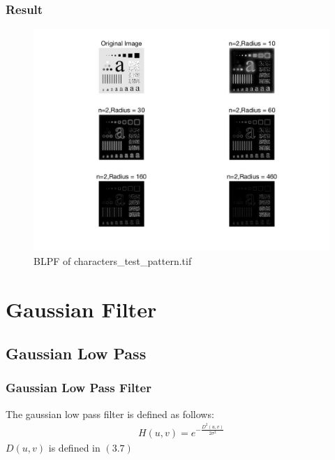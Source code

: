\documentclass[11pt,oneside]{book}
\begin{document}
\subsubsection{Result}
\begin{figure}[!htb]
   \centering  
   \includegraphics[width=1.0\textwidth]{images/3/BHPF.jpg}
   \caption{BLPF of characters\_test\_pattern.tif}  
\end{figure}
\newpage


\section{Gaussian Filter}
\subsection{Gaussian Low Pass}
\subsubsection{Gaussian Low Pass Filter}
The gaussian low pass filter is defined as follows:\\
\begin{align}
H(u,v)=e^{-\frac{D^2(u,v)}{2\sigma^2}}
\end{align}
$D(u,v)$ is defined in $(3.7)$
\end{document}
